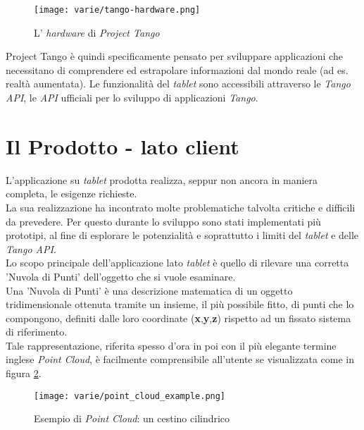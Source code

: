 \begin{figure}[!h] 
    \centering 
    \texttt{[image: varie/tango-hardware.png]} 
    \caption{L' \emph{hardware} di \emph{Project Tango}}
    \label{fig:tango_hardware}
\end{figure}

\noindent
Project Tango è quindi specificamente pensato per sviluppare applicazioni che necessitano di comprendere ed estrapolare informazioni dal mondo reale (ad es. realtà aumentata).
Le funzionalità del \emph{tablet} sono accessibili attraverso le \emph{Tango API}, le \emph{API} ufficiali per lo sviluppo di applicazioni \emph{Tango}.


\section{Il Prodotto - lato client}

L'applicazione su \emph{tablet} prodotta realizza, seppur non ancora in maniera completa, le esigenze richieste. \\
La sua realizzazione ha incontrato molte problematiche talvolta critiche e difficili da prevedere. Per questo durante lo sviluppo sono stati implementati più prototipi, al fine di esplorare le potenzialità e soprattutto i limiti del \emph{tablet} e delle \emph{Tango API}. \\
Lo scopo principale dell'applicazione lato \emph{tablet} è quello di rilevare una corretta 'Nuvola di Punti' dell'oggetto che si vuole esaminare.\\
Una 'Nuvola di Punti' è una descrizione matematica di un oggetto tridimensionale ottenuta tramite un insieme, il più possibile fitto, di punti che lo compongono, definiti dalle loro coordinate (\textbf{x},\textbf{y},\textbf{z}) rispetto ad un fissato sistema di riferimento. \\
Tale rappresentazione, riferita spesso d'ora in poi con il più elegante termine inglese \emph{Point Cloud}, è facilmente comprensibile all'utente se visualizzata come in figura \ref{fig:point_cloud_example}.
\begin{figure}[!h] 
    \centering 
    \texttt{[image: varie/point\_cloud\_example.png]} 
    \caption{Esempio di \emph{Point Cloud}: un cestino cilindrico}
   \label{fig:point_cloud_example}
\end{figure}

